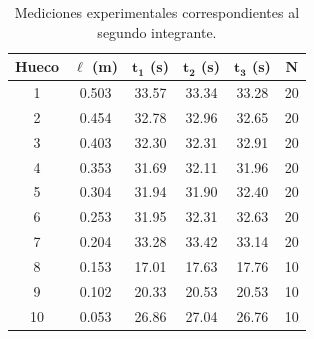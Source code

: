 \documentclass[11pt,a4paper]{article}
\begin{document}
\begin{table}[H]
    \centering
    \small
    \renewcommand{\arraystretch}{0.92}
    \setlength{\tabcolsep}{9pt}

    \begin{tabular}{cccccc}
        \toprule
        \textbf{Hueco} &
        $\boldsymbol{\ell}$ \textbf{(m)} &
        $\boldsymbol{t_1}$ \textbf{(s)} &
        $\boldsymbol{t_2}$ \textbf{(s)} &
        $\boldsymbol{t_3}$ \textbf{(s)} &
        $\boldsymbol{N}$ \\
        \midrule

        1  & 0.503 & 33.57 & 33.34 & 33.28 & 20 \\
        2  & 0.454 & 32.78 & 32.96 & 32.65 & 20 \\
        3  & 0.403 & 32.30 & 32.31 & 32.91 & 20 \\
        4  & 0.353 & 31.69 & 32.11 & 31.96 & 20 \\
        5  & 0.304 & 31.94 & 31.90 & 32.40 & 20 \\
        6  & 0.253 & 31.95 & 32.31 & 32.63 & 20 \\
        7  & 0.204 & 33.28 & 33.42 & 33.14 & 20 \\
        8  & 0.153 & 17.01 & 17.63 & 17.76 & 10 \\
        9  & 0.102 & 20.33 & 20.53 & 20.53 & 10 \\
        10 & 0.053 & 26.86 & 27.04 & 26.76 & 10 \\

        \bottomrule
    \end{tabular}

    \caption{Mediciones experimentales correspondientes al segundo integrante.}
    \label{tab:datos_integrante2}
\end{table}

\vspace{-0.25cm}
\end{document}
